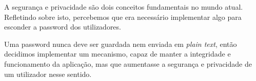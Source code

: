 A segurança e privacidade são dois conceitos fundamentais no mundo atual. Refletindo sobre isto, percebemos que era necessário implementar algo para esconder a password dos utilizadores.

Uma password nunca deve ser guardada nem enviada em \textit{plain text}, então decidimos implementar um mecanismo, capaz de manter a integridade e funcionamento da aplicação, mas que aumentasse a segurança e privacidade de um utilizador nesse sentido.

